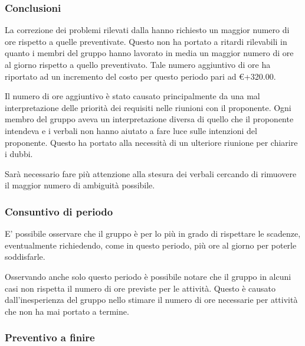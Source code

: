 \documentclass[12pt,a4paper]{article}
\begin{document}
\subsubsection{Conclusioni}

\par La correzione dei problemi rilevati dalla \RR{} hanno richiesto un maggior numero di ore rispetto a quelle preventivate. Questo non ha portato a ritardi rilevabili in quanto i membri del gruppo hanno lavorato in media un maggior numero di ore al giorno rispetto a quello preventivato. Tale numero aggiuntivo di ore ha riportato ad un incremento del costo per questo periodo pari ad \euro{}+320.00. \\

\par Il numero di ore aggiuntivo è stato causato principalmente da una mal interpretazione delle priorità dei requisiti nelle riunioni con il proponente. Ogni membro del gruppo aveva un interpretazione diversa di quello che il proponente intendeva e i verbali non hanno aiutato a fare luce sulle intenzioni del proponente. Questo ha portato alla necessità di un ulteriore riunione per chiarire i dubbi. \\

\par Sarà necessario fare più attenzione alla stesura dei verbali cercando di rimuovere il maggior numero di ambiguità possibile. \\

\subsubsection{Consuntivo di periodo}

\par E' possibile osservare che il gruppo è per lo più in grado di rispettare le scadenze, eventualmente richiedendo, come in questo periodo, più ore al giorno per poterle soddisfarle. \\

\par Osservando anche solo questo periodo è possibile notare che il gruppo in alcuni casi non rispetta il numero di ore previste per le attività. Questo è causato dall'inesperienza del gruppo nello stimare il numero di ore necessarie per attività che non ha mai portato a termine. \\

\subsubsection{Preventivo a finire}
\end{document}
